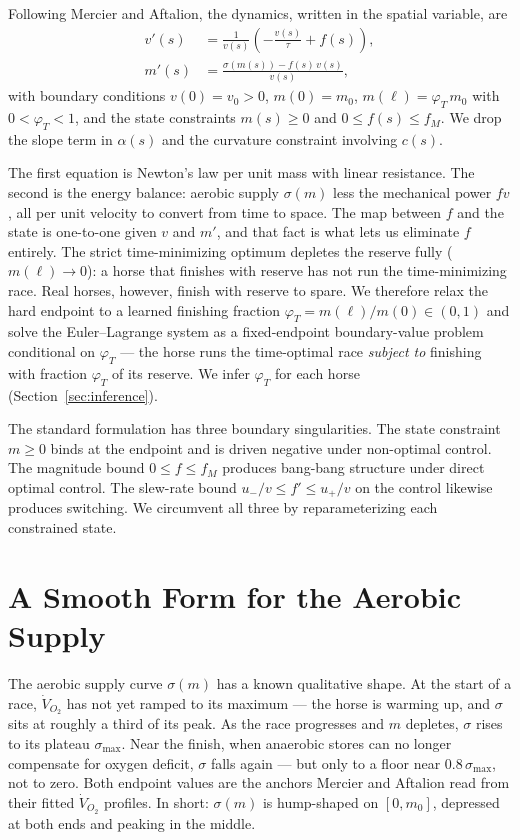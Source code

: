 \documentclass[11pt]{article}
\begin{document}
Following Mercier and Aftalion, the dynamics, written in the spatial variable, are
\begin{align}
v'(s) &= \frac{1}{v(s)}\left(-\frac{v(s)}{\tau} + f(s)\right), \\
m'(s) &= \frac{\sigma(m(s)) - f(s)\, v(s)}{v(s)},
\end{align}
with boundary conditions $v(0) = v_0 > 0$, $m(0) = m_0$, $m(\ell) = \varphi_T\, m_0$ with $0 < \varphi_T < 1$, and the state constraints $m(s) \geq 0$ and $0 \leq f(s) \leq f_M$. We drop the slope term in $\alpha(s)$ and the curvature constraint involving $c(s)$.

The first equation is Newton's law per unit mass with linear resistance. The second is the energy balance: aerobic supply $\sigma(m)$ less the mechanical power $fv$, all per unit velocity to convert from time to space. The map between $f$ and the state is one-to-one given $v$ and $m'$, and that fact is what lets us eliminate $f$ entirely. The strict time-minimizing optimum depletes the reserve fully ($m(\ell) \to 0$): a horse that finishes with reserve has not run the time-minimizing race. Real horses, however, finish with reserve to spare. We therefore relax the hard endpoint to a learned finishing fraction $\varphi_T = m(\ell)/m(0) \in (0, 1)$ and solve the Euler--Lagrange system as a fixed-endpoint boundary-value problem conditional on $\varphi_T$ --- the horse runs the time-optimal race \emph{subject to} finishing with fraction $\varphi_T$ of its reserve. We infer $\varphi_T$ for each horse (Section~\ref{sec:inference}).

The standard formulation has three boundary singularities. The state constraint $m \geq 0$ binds at the endpoint and is driven negative under non-optimal control. The magnitude bound $0 \leq f \leq f_M$ produces bang-bang structure under direct optimal control. The slew-rate bound $u_-/v \leq f' \leq u_+/v$ on the control likewise produces switching. We circumvent all three by reparameterizing each constrained state.

\section{A Smooth Form for the Aerobic Supply}

The aerobic supply curve $\sigma(m)$ has a known qualitative shape. At the start of a race, $\dot V_{O_2}$ has not yet ramped to its maximum --- the horse is warming up, and $\sigma$ sits at roughly a third of its peak. As the race progresses and $m$ depletes, $\sigma$ rises to its plateau $\sigma_{\max}$. Near the finish, when anaerobic stores can no longer compensate for oxygen deficit, $\sigma$ falls again --- but only to a floor near $0.8\,\sigma_{\max}$, not to zero. Both endpoint values are the anchors Mercier and Aftalion read from their fitted $\dot V_{O_2}$ profiles. In short: $\sigma(m)$ is hump-shaped on $[0, m_0]$, depressed at both ends and peaking in the middle.
\end{document}

